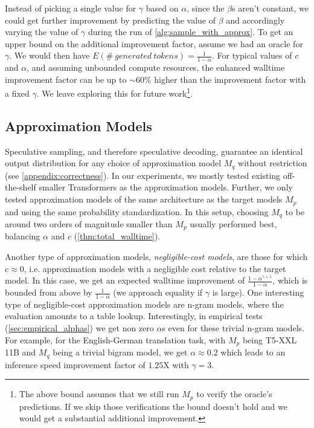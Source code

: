 \documentclass[nohyperref]{article}
\theoremstyle{plain}
\theoremstyle{definition}
\theoremstyle{remark}
\begin{document}
Instead of picking a single value for $\gamma$ based on $\alpha$, since the $\beta$s aren’t constant,
we could get further improvement by predicting the value of $\beta$ and accordingly varying the value of $\gamma$ during the run of \cref{alg:sample_with_approx}. To get an upper bound on the additional improvement factor, assume we had an oracle for $\gamma$. We would then have $E(\#\ generated\ tokens) = \frac{1}{1-\alpha}$.
For typical values of $c$ and $\alpha$, and assuming unbounded compute resources, the enhanced walltime improvement factor can be up to $\sim$60\% higher than the improvement factor with a fixed $\gamma$. We leave exploring this for future work\footnote{The above bound assumes that we still run $M_p$ to verify the oracle's predictions. If we skip those verifications the bound doesn't hold and we would get a substantial additional improvement.}.

\subsection{Approximation Models}
\label{sec:approximation_models}
Speculative sampling, and therefore speculative decoding, guarantee an identical output distribution for any choice of approximation model $M_q$ without restriction (see \cref{appendix:correctness}).
In our experiments, we mostly tested existing off-the-shelf smaller Transformers as the approximation models.
Further, we only tested approximation models of the same architecture as the target models $M_p$ and using the same probability standardization.
In this setup, choosing $M_q$ to be around two orders of magnitude smaller than $M_p$ usually performed best, balancing $\alpha$ and $c$ (\cref{thm:total_walltime}).

Another type of approximation models, \emph{negligible-cost models}, are those for which $c \approx 0$, i.e. approximation models with a negligible cost relative to the target model. In this case, we get an expected walltime improvement of $\frac{1 - \alpha^{\gamma + 1}}{1 - \alpha}$, which is bounded from above by $\frac{1}{1 - \alpha}$ (we approach equality if $\gamma$ is large).
One interesting type of negligible-cost approximation models are n-gram models, where the evaluation amounts to a table lookup. Interestingly, in empirical tests (\cref{sec:empirical_alphas}) we get non zero $\alpha$s even for these trivial n-gram models. For example, for the English-German translation task, with $M_p$ being T5-XXL 11B and $M_q$ being a trivial bigram model, we get $\alpha \approx 0.2$ which leads to an inference speed improvement factor of $1.25$X with $\gamma=3$.
\end{document}
